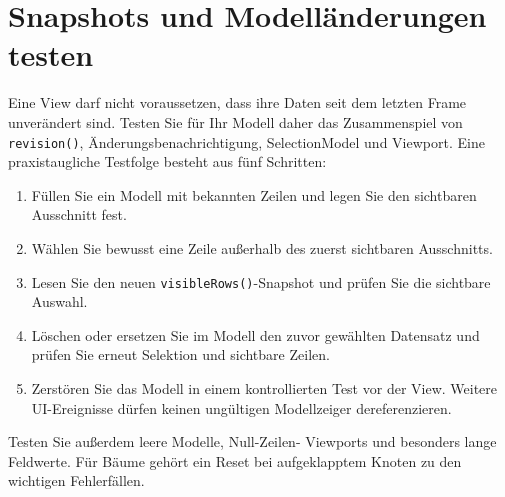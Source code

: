 \section{Snapshots und Modelländerungen testen}
Eine View darf nicht voraussetzen, dass ihre Daten
seit dem letzten Frame unverändert sind. Testen
Sie für Ihr Modell daher das Zusammenspiel von
\texttt{revision()}, Änderungsbenachrichtigung,
SelectionModel und Viewport. Eine praxistaugliche
Testfolge besteht aus fünf Schritten:
\begin{enumerate}
\item Füllen Sie ein Modell mit bekannten Zeilen und
legen Sie den sichtbaren Ausschnitt fest.
\item Wählen Sie bewusst eine Zeile außerhalb
des zuerst sichtbaren Ausschnitts.
\item Lesen Sie den neuen \texttt{visibleRows()}-Snapshot
und prüfen Sie die sichtbare Auswahl.
\item Löschen oder ersetzen Sie im Modell den zuvor
gewählten Datensatz und prüfen Sie erneut Selektion
und sichtbare Zeilen.
\item Zerstören Sie das Modell in einem kontrollierten
Test vor der View. Weitere UI-Ereignisse dürfen
keinen ungültigen Modellzeiger dereferenzieren.
\end{enumerate}
Testen Sie außerdem leere Modelle, Null-Zeilen-
Viewports und besonders lange Feldwerte. Für
Bäume gehört ein Reset bei aufgeklapptem Knoten
zu den wichtigen Fehlerfällen.

